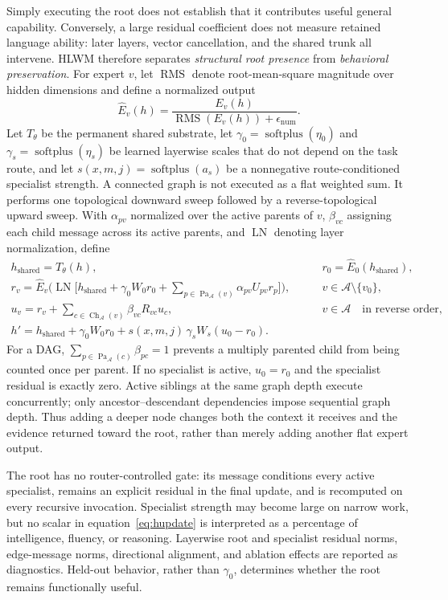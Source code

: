 \documentclass[10pt,a4paper]{article}
\newcommand{\op}[1]{\operatorname{#1}}
\newcommand{\eps}{\epsilon}
\newcommand{\Acal}{\mathcal{A}}
\begin{document}
Simply executing the root does not establish that it contributes useful
general capability. Conversely, a large residual coefficient does not measure
retained language ability: later layers, vector cancellation, and the shared
trunk all intervene. HLWM therefore separates \emph{structural root presence}
from \emph{behavioral preservation}. For expert $v$, let $\op{RMS}$ denote
root-mean-square magnitude over hidden dimensions and define a normalized
output
\begin{equation}
\widehat{E}_v(h) = \frac{E_v(h)}{\op{RMS}(E_v(h)) + \eps_{\mathrm{num}}} .
\end{equation}
Let $T_\theta$ be the permanent shared substrate, let
$\gamma_0 = \op{softplus}(\eta_0)$ and $\gamma_s = \op{softplus}(\eta_s)$ be
learned layerwise scales that do not depend on the task route, and let
$s(x, m, j) = \op{softplus}(a_s)$ be a nonnegative route-conditioned specialist
strength. A connected graph is not executed as a flat weighted sum. It performs
one topological downward sweep followed by a reverse-topological upward sweep.
With $\alpha_{pv}$ normalized over the active parents of $v$, $\beta_{vc}$
assigning each child message across its active parents, and $\op{LN}$ denoting
layer normalization, define
\begin{align}
h_{\mathrm{shared}} = T_\theta(h), &\qquad r_0 = \widehat{E}_0(h_{\mathrm{shared}}), \\
r_v = \widehat{E}_v\!\Biggl( \op{LN}\Biggl[ h_{\mathrm{shared}} + \gamma_0 W_0 r_0
  + \sum_{p \in \op{Pa}_{\Acal}(v)} \alpha_{pv} U_{pv} r_p \Biggr] \Biggr),
  &\qquad v \in \Acal \setminus \{v_0\}, \\
u_v = r_v + \sum_{c \in \op{Ch}_{\Acal}(v)} \beta_{vc} R_{vc} u_c,
  &\qquad v \in \Acal \quad \text{in reverse order}, \\
h' = h_{\mathrm{shared}} + \gamma_0 W_0 r_0 + s(x,m,j)\, \gamma_s W_s (u_0 - r_0). &
\label{eq:hupdate}
\end{align}
For a DAG, $\sum_{p \in \op{Pa}_{\Acal}(c)} \beta_{pc} = 1$ prevents a multiply
parented child from being counted once per parent. If no specialist is active,
$u_0 = r_0$ and the specialist residual is exactly zero. Active siblings at the
same graph depth execute concurrently; only ancestor--descendant dependencies
impose sequential graph depth. Thus adding a deeper node changes both the
context it receives and the evidence returned toward the root, rather than
merely adding another flat expert output.

The root has no router-controlled gate: its message conditions every active
specialist, remains an explicit residual in the final update, and is recomputed
on every recursive invocation. Specialist strength may become large on narrow
work, but no scalar in equation~\eqref{eq:hupdate} is interpreted as a
percentage of intelligence, fluency, or reasoning. Layerwise root and
specialist residual norms, edge-message norms, directional alignment, and
ablation effects are reported as diagnostics. Held-out behavior, rather than
$\gamma_0$, determines whether the root remains functionally useful.
\end{document}
